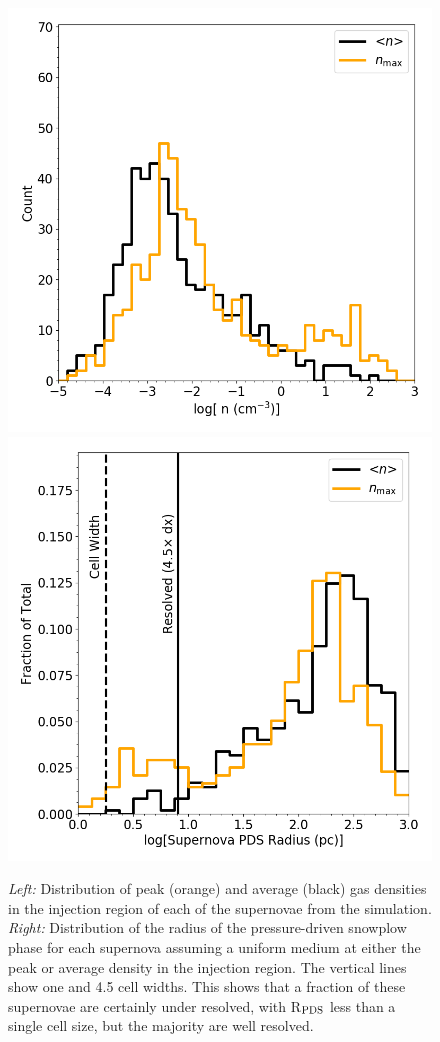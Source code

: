 \documentclass[twocolumn]{aastex61}
\begin{document}
\begin{figure}
\centering
\includegraphics[width=0.4\linewidth]{sn_density_hist}
\includegraphics[width=0.4\linewidth]{sn_radius_hist}
\caption{{\em Left:} Distribution of peak (orange) and average (black) gas densities in the injection region of each of the supernovae from the simulation. {\em Right:} Distribution of the radius of the pressure-driven snowplow phase for each supernova assuming a uniform medium at either the peak or average density in the injection region. The vertical lines show one and 4.5 cell widths. This shows that a fraction of these supernovae are certainly under resolved, with R$_{\rm PDS}$ less than a single cell size, but the majority are well resolved.}
\label{fig:supernova histogram}
\end{figure}

%
%
\end{document}
